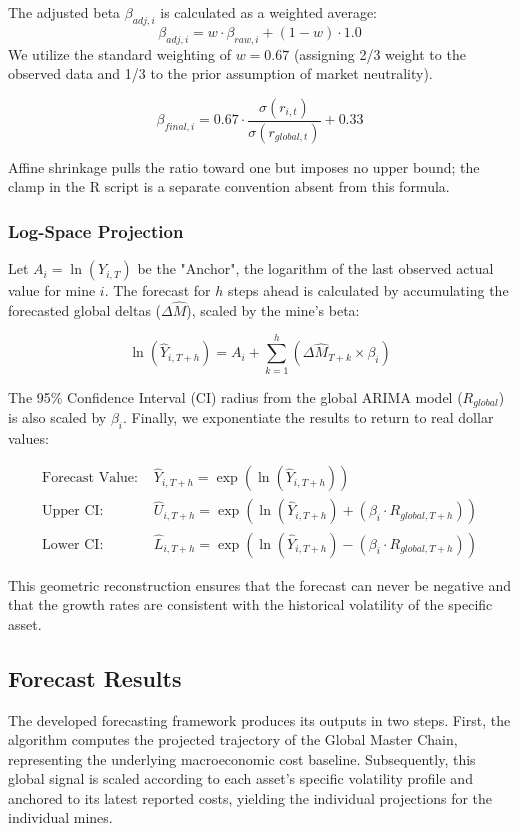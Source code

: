 The adjusted beta $\beta_{adj,i}$ is calculated as a weighted average:
\[
\beta_{adj,i} = w \cdot \beta_{raw,i} + (1 - w) \cdot 1.0
\]
We utilize the standard weighting of $w = 0.67$ (assigning 2/3 weight to the observed data and 1/3 to the prior assumption of market neutrality).

\[
\beta_{final,i} = 0.67 \cdot \frac{\sigma(r_{i,t})}{\sigma(r_{global,t})} + 0.33
\]

Affine shrinkage pulls the ratio toward one but imposes no upper bound; the clamp in the R script is a separate convention absent from this formula.
\subsubsection{Log-Space Projection}
Let $A_{i} = \ln(Y_{i, T})$ be the "Anchor", the logarithm of the last observed actual value for mine $i$. The forecast for $h$ steps ahead is calculated by accumulating the forecasted global deltas ($\Delta \hat{M}$), scaled by the mine's beta:

\[
\ln(\hat{Y}_{i, T+h}) = A_{i} + \sum_{k=1}^{h} (\Delta \hat{M}_{T+k} \times \beta_i)
\]

The 95\% Confidence Interval (CI) radius from the global ARIMA model ($R_{global}$) is also scaled by $\beta_i$. Finally, we exponentiate the results to return to real dollar values:

\begin{align*}
    \text{Forecast Value: } & \hat{Y}_{i, T+h} = \exp\left( \ln(\hat{Y}_{i, T+h}) \right) \\
    \text{Upper CI: } & \hat{U}_{i, T+h} = \exp\left( \ln(\hat{Y}_{i, T+h}) + (\beta_i \cdot R_{global, T+h}) \right) \\
    \text{Lower CI: } & \hat{L}_{i, T+h} = \exp\left( \ln(\hat{Y}_{i, T+h}) - (\beta_i \cdot R_{global, T+h}) \right)
\end{align*}

This geometric reconstruction ensures that the forecast can never be negative and that the growth rates are consistent with the historical volatility of the specific asset.
\subsection{Forecast Results}

The developed forecasting framework produces its outputs in two steps. First, the algorithm computes the projected trajectory of the Global Master Chain, representing the underlying macroeconomic cost baseline. Subsequently, this global signal is scaled according to each asset's specific volatility profile and anchored to its latest reported costs, yielding the individual projections for the individual mines.






